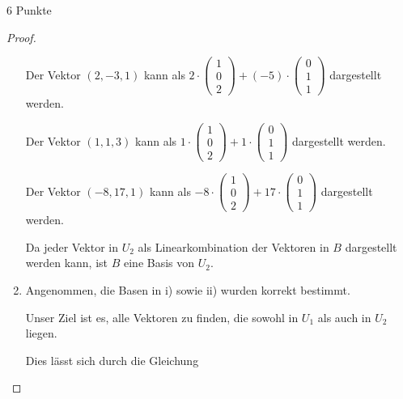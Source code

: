 \documentclass{problemset}
\begin{document}
\begin{problem}{6 Punkte}
\begin{proof}
\begin{enumerate}
              Der Vektor $(2, -3, 1)$ kann als $2 \cdot \begin{pmatrix} 1 \\ 0 \\ 2 \end{pmatrix} + (-5) \cdot \begin{pmatrix} 0 \\ 1 \\ 1 \end{pmatrix}$ dargestellt werden.

              Der Vektor $(1, 1, 3)$ kann als $1 \cdot \begin{pmatrix} 1 \\ 0 \\ 2 \end{pmatrix} + 1 \cdot \begin{pmatrix} 0 \\ 1 \\ 1 \end{pmatrix}$ dargestellt werden.

              Der Vektor $(-8, 17, 1)$ kann als $-8 \cdot \begin{pmatrix} 1 \\ 0 \\ 2 \end{pmatrix} + 17 \cdot \begin{pmatrix} 0 \\ 1 \\ 1 \end{pmatrix}$ dargestellt werden.

              Da jeder Vektor in $U_2$ als Linearkombination der Vektoren in
              $B$ dargestellt werden kann, ist $B$ eine Basis von $U_2$.

        \item Angenommen, die Basen in i) sowie ii) wurden korrekt bestimmt.

              Unser Ziel ist es, alle Vektoren zu finden, die sowohl in \(U_1\)
              als auch in \(U_2\) liegen.

              Dies lässt sich durch die Gleichung


\end{enumerate}
\end{proof}
\end{problem}
\end{document}
